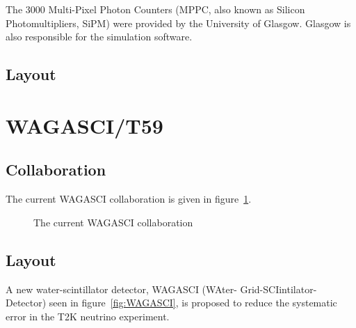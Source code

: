 The 3000 Multi-Pixel Photon Counters (MPPC, also known as Silicon Photomultipliers, SiPM) were provided by the University of Glasgow. Glasgow is also responsible for the simulation software.
\subsection{Layout}


\section{WAGASCI/T59}



\subsection{Collaboration}

The current WAGASCI collaboration is given in figure~\ref{fig:collaborationW}.
\begin{figure}[h!]
\centering
{}
\caption{The current WAGASCI collaboration}
\label{fig:collaborationW}
\end{figure}

\subsection{Layout}
A new water-scintillator detector, WAGASCI (WAter- Grid-SCIintilator-Detector) seen in figure~\ref{fig:WAGASCI}, is proposed to reduce the systematic error in the T2K neutrino experiment.

